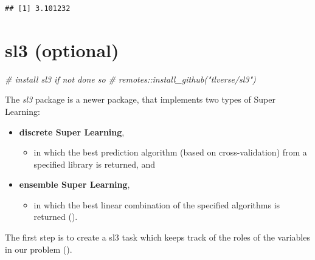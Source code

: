 \documentclass[
]{book}
\newenvironment{Shaded}{\begin{snugshade}}{\end{snugshade}}
\newcommand{\CommentTok}[1]{\textcolor[rgb]{0.56,0.35,0.01}{\textit{#1}}}
\newcommand{\NormalTok}[1]{#1}
\newcommand{\SpecialCharTok}[1]{\textcolor[rgb]{0.00,0.00,0.00}{#1}}
\providecommand{\tightlist}{%
  \setlength{\itemsep}{0pt}\setlength{\parskip}{0pt}}
\begin{document}
\begin{Shaded}
\end{Shaded}

\begin{verbatim}
## [1] 3.101232
\end{verbatim}

\hypertarget{sl3-optional}{%
\section{sl3 (optional)}\label{sl3-optional}}

\begin{Shaded}
\begin{Highlighting}[]
\CommentTok{\# install sl3 if not done so}
\CommentTok{\# remotes::install\_github("tlverse/sl3")}
\end{Highlighting}
\end{Shaded}

The \emph{sl3} package is a newer package, that implements two types of Super Learning:

\begin{itemize}
\tightlist
\item
  \textbf{discrete Super Learning},

  \begin{itemize}
  \tightlist
  \item
    in which the best prediction algorithm (based on cross-validation) from a specified library is returned, and
  \end{itemize}
\item
  \textbf{ensemble Super Learning},

  \begin{itemize}
  \tightlist
  \item
    in which the best linear combination of the specified algorithms is returned (\citet{coyle2021sl3}).
  \end{itemize}
\end{itemize}

The first step is to create a sl3 task which keeps track of the roles of the variables in our problem (\citet{coyle2021tlverse}).
\end{document}
